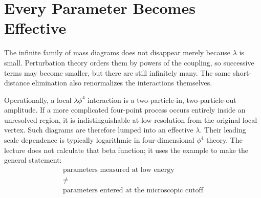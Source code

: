 \begin{classroomqa}
\end{classroomqa}

\section{Every Parameter Becomes Effective}

The infinite family of mass diagrams does not disappear merely because
\(\lambda\) is small. Perturbation theory orders
them by powers of the coupling, so successive terms may become smaller, but
there are still infinitely many. The same short-distance elimination also
renormalizes the interactions themselves.

\begin{classroomqa}
\end{classroomqa}

Operationally, a local \(\lambda\phi^4\) interaction is a
two-particle-in, two-particle-out amplitude. If a more complicated four-point
process occurs entirely inside an unresolved region, it is indistinguishable
at low resolution from the original local vertex. Such diagrams are
therefore lumped into an effective \(\lambda\). Their leading scale dependence
is typically logarithmic in four-dimensional \(\phi^4\) theory. The lecture
does not calculate that beta function; it uses the example to make the
general statement:
\begin{equation}
\begin{gathered}
\text{parameters measured at low energy}\\
\ne\\
\text{parameters entered at the microscopic cutoff}
\end{gathered}
\end{equation}

